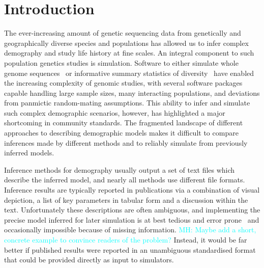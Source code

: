 \documentclass[11pt]{article}
\newcommand{\stdpopsim}[0]{\texttt{stdpopsim}}
\newcommand{\aprcomment}[1]{{\textcolor{blue}{APR: #1}}}
\newcommand{\mhcomment}[1]{{\textcolor{cyan}{MH: #1}}}
\begin{document}
\section*{Introduction}

The ever-increasing amount of genetic sequencing data from genetically and
geographically diverse species and populations has allowed us to infer complex
demography and study life history at fine scales.
An integral component to such population genetics studies is simulation.
Software to either simulate whole genome
sequences~\citep{thornton2014cpp,thornton2019-nu,staab2015scrm,baumdicker2021-iu,kelleher2016efficient,haller2019slim}
or informative summary statistics of
diversity~\citep{gutenkunst2009inferring,kamm2017efficient,jouganous2017inferring}
have enabled the increasing complexity of genomic studies, with several software
packages capable handling large sample sizes, many interacting populations, and
deviations from panmictic random-mating assumptions.
This ability to infer and simulate such complex demographic scenarios, however,
has highlighted a major shortcoming in community standards.
The fragmented landscape of different approaches to describing demographic
models makes it difficult to compare inferences made by different methods
and to reliably simulate from previously inferred models.

Inference methods for demography usually output a set of
text files which describe the inferred model,
and nearly all methods use different file formats.
Inference results are typically reported in publications
via a combination of visual depiction,
a list of key parameters in tabular form and a discussion within the text.
Unfortunately these descriptions are often ambiguous, and
implementing the precise model inferred for later simulation
is at best tedious and error prone~\citep{ragsdale2020lessons}
and occasionally impossible because of missing information. \mhcomment{Maybe add a short, concrete example to convince readers of the problem?}
Instead, it would be far better if published results were reported
in an unambiguous standardised format that could be provided
directly as input to simulators.
\end{document}
